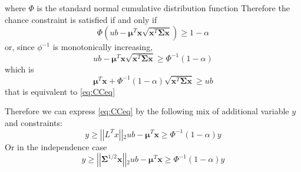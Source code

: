  where $\Phi$ is the standard normal cumulative distribution function
 Therefore the chance constraint is satisfied if and only if
  \begin{equation}
 \Phi\left( ub  - \boldsymbol{\mu}^{T}\boldsymbol{x}{\sqrt{\boldsymbol{x}^{T}\boldsymbol{\Sigma} \boldsymbol{x}}} \right) \geq 1- \alpha
\end{equation}
or, since $\phi^{-1}$ is monotonically increasing,
 \begin{equation}
 ub  - \boldsymbol{\mu}^{T}\boldsymbol{x} \sqrt{\boldsymbol{x}^{T}\boldsymbol{\Sigma} \boldsymbol{x}} \geq \Phi^{-1}\left(1- \alpha\right) 
\end{equation}
 which is 
 \begin{equation}
 \boldsymbol{\mu}^{T}\boldsymbol{x}+\Phi^{-1}\left(1- \alpha\right) \sqrt{\boldsymbol{x}^{T}\boldsymbol{\Sigma} \boldsymbol{x}} \geq ub
 \end{equation}
that is equivalent to \eqref{eq:CCeq}
\par Therefore we can express \eqref{eq:CCeq} by the following mix of additional variable $y$ and constraints:
\begin{subequations}
 \begin{equation}
y \geq \left| \left| L^Tx  \right| \right| {}_2
\end{equation}
 \begin{equation}
ub-\boldsymbol{\mu}^{T} \boldsymbol{x} \geq \Phi^{-1}(1-\alpha)y
\end{equation}
\label{eq:CCeq2}
\end{subequations}
Or in the independence case
\begin{subequations}
	\begin{equation}
	y \geq \left| \left| \boldsymbol{\Sigma}^{1/2}\boldsymbol{x}  \right| \right| {}_2
	\end{equation}
	\begin{equation}
	ub-\boldsymbol{\mu}^{T} \boldsymbol{x} \geq \Phi^{-1}(1-\alpha)y
	\end{equation}
	\label{eq:CCeq2}
\end{subequations}
